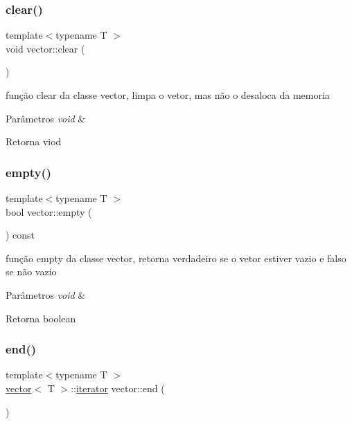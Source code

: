 \subsubsection{\texorpdfstring{clear()}{clear()}}
{\footnotesize\ttfamily template$<$typename T $>$ \\
void vector\+::clear (\begin{DoxyParamCaption}{ }\end{DoxyParamCaption})}

função clear da classe vector, limpa o vetor, mas não o desaloca da memoria 
\begin{DoxyParams}{Parâmetros}
{\em void} & \\
\hline
\end{DoxyParams}
\begin{DoxyReturn}{Retorna}
viod 
\end{DoxyReturn}
\mbox{\label{classsc_1_1vector_ae189cd89e598a752b891e55869694f17}} 
\subsubsection{\texorpdfstring{empty()}{empty()}}
{\footnotesize\ttfamily template$<$typename T $>$ \\
bool vector\+::empty (\begin{DoxyParamCaption}\item[{void}]{ }\end{DoxyParamCaption}) const}

função empty da classe vector, retorna verdadeiro se o vetor estiver vazio e falso se não vazio 
\begin{DoxyParams}{Parâmetros}
{\em void} & \\
\hline
\end{DoxyParams}
\begin{DoxyReturn}{Retorna}
boolean 
\end{DoxyReturn}
\mbox{\label{classsc_1_1vector_a15b7f4313d7a011694d154c030768ad3}} 
\subsubsection{\texorpdfstring{end()}{end()}}
{\footnotesize\ttfamily template$<$typename T $>$ \\
\mbox{\hyperlink{classsc_1_1vector}{vector}}$<$ T $>$\+::\mbox{\hyperlink{classsc_1_1vector_1_1iterator}{iterator}} vector\+::end (\begin{DoxyParamCaption}\item[{void}]{ }\end{DoxyParamCaption})}

